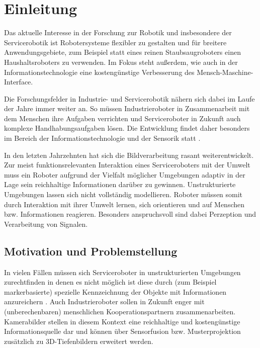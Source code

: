 \chapter{Einleitung}
\label{einleitung_cha}
\authorsection{\editordummy}
Das aktuelle Interesse in der Forschung zur Robotik und insbesondere der Servicerobotik
 ist Robotersysteme flexibler zu gestalten und für breitere Anwendungsgebiete, zum Beispiel
 statt eines reinen Staubsaugroboters einen Haushaltsroboters zu verwenden.
 Im Fokus steht außerdem, wie auch in der Informationstechnologie eine kostengünstige Verbesserung des Mensch-Maschine-Interface.
 \citep{IP08}

Die Forschungsfelder in Industrie- und Servicerobotik nähern sich dabei im Laufe der Jahre immer weiter an.
 So müssen Industrieroboter in Zusammenarbeit mit dem Menschen ihre Aufgaben verrichten und Serviceroboter
 in Zukunft auch komplexe Handhabungsaufgaben lösen. Die Entwicklung findet daher besonders im Bereich der
 Informationstechnologie und der Sensorik statt \citep{Michael2010}.
 
In den letzten Jahrzehnten hat sich die Bildverarbeitung rasant weiterentwickelt.
 Zur meist funktionsrelevanten Interaktion eines Serviceroboters mit der Umwelt muss
 ein Roboter aufgrund der Vielfalt möglicher Umgebungen adaptiv in der Lage sein reichhaltige
 Informationen darüber zu gewinnen. Unstrukturierte Umgebungen lassen sich nicht vollständig modellieren.
 Roboter müssen somit durch Interaktion mit ihrer Umwelt lernen, sich orientieren und auf Menschen bzw. Informationen reagieren.
 Besonders anspruchsvoll sind dabei Perzeption und Verarbeitung von Signalen.

\section{Motivation und Problemstellung}
\label{motivation_sec}
\authorsection{\editordummy}

In vielen Fällen müssen sich Serviceroboter in unstrukturierten Umgebungen zurechtfinden in denen es nicht möglich ist diese durch
 (zum Beispiel markerbasierte) spezielle Kennzeichnung der Objekte mit Informationen anzureichern \citep{sturm10rss-workshop}.
 Auch Industrieroboter sollen in Zukunft enger mit (unberechenbaren) menschlichen Kooperationspartnern zusammenarbeiten.
 Kamerabilder stellen in diesem Kontext eine reichhaltige und kostengünstige Informationsquelle dar und können über Sensorfusion bzw. Musterprojektion zusätzlich
 zu 3D-Tiefenbildern erweitert werden. 

